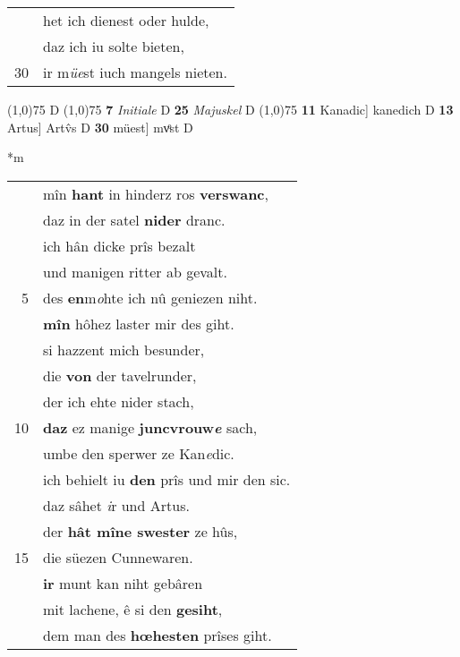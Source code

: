 \documentclass[8pt,a4paper,notitlepage]{article}
\begin{document}
\begin{table}[ht]
\begin{minipage}[t]{0.5\linewidth}
\begin{tabular}{rl}
 & het ich dienest oder hulde,\\ 
 & daz ich iu solte bieten,\\ 
30 & ir m\textit{üe}st iuch mangels nieten.\\ 
\end{tabular}
\scriptsize
\line(1,0){75} \newline
D \newline
\line(1,0){75} \newline
\textbf{7} \textit{Initiale} D  \textbf{25} \textit{Majuskel} D  \newline
\line(1,0){75} \newline
\textbf{11} Kanadic] kanedich D \textbf{13} Artus] Artv̂s D \textbf{30} müest] mvͦst D \newline
\end{minipage}
\hspace{0.5cm}
\begin{minipage}[t]{0.5\linewidth}
\small
\begin{center}*m
\end{center}
\begin{tabular}{rl}
 & mîn \textbf{hant} in hinderz ros \textbf{verswanc},\\ 
 & daz in der satel \textbf{nider} dranc.\\ 
 & ich hân dicke prîs bezalt\\ 
 & und manigen ritter ab gevalt.\\ 
5 & des \textbf{en}m\textit{o}hte ich nû geniezen niht.\\ 
 & \textbf{mîn} hôhez laster mir des giht.\\ 
 & si hazzent mich besunder,\\ 
 & die \textbf{von} der tavelrunder,\\ 
 & der ich ehte nider stach,\\ 
10 & \textbf{daz} ez manige \textbf{juncvrouw\textit{e}} sach,\\ 
 & umbe den sperwer ze Kan\textit{e}dic.\\ 
 & ich behielt iu \textbf{den} prîs und mir den sic.\\ 
 & daz sâhet \textit{i}r und Artus.\\ 
 & der \textbf{hât mîne swester} ze hûs,\\ 
15 & die süezen Cunnewaren.\\ 
 & \textbf{ir} munt kan niht gebâren\\ 
 & mit lachene, ê si den \textbf{gesiht},\\ 
 & dem man des \textbf{hœhesten} prîses giht.\\ 

\end{tabular}
\end{minipage}
\end{table}
\end{document}
